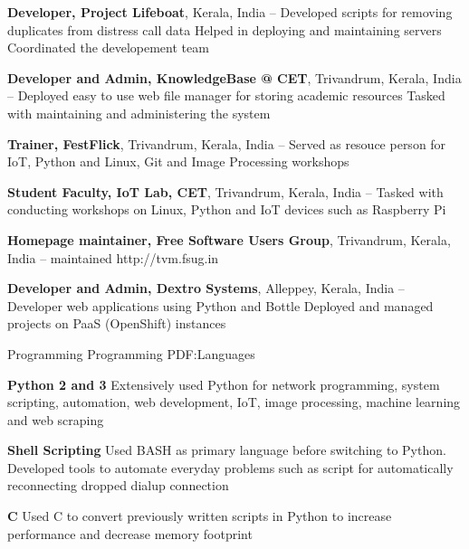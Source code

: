 \documentclass[letterpaper,MMMyyyy,nonstopmode]{simpleresumecv}
\begin{document}
\begin{Body}
\BigGap
\Entry
{\textbf{Developer, Project Lifeboat}},
Kerala, India
\hfill
{} -- 
\Gap
\BulletItem
Developed scripts for removing duplicates from distress call data
\BulletItem
Helped in deploying and maintaining servers
\BulletItem
Coordinated the developement team

\BigGap
\Entry
{\textbf{Developer and Admin, KnowledgeBase @ CET}},
Trivandrum, Kerala, India
\hfill
{} -- 
\Gap
\BulletItem
Deployed easy to use web file manager for storing academic resources 
\BulletItem
Tasked with maintaining and administering the system

\BigGap
\Entry
{\textbf{Trainer, FestFlick}},
Trivandrum, Kerala, India
\hfill
{} -- 
\Gap
\BulletItem
Served as resouce person for IoT, Python and Linux, Git and Image Processing
workshops

\BigGap
\Entry
{\textbf{Student Faculty, IoT Lab, CET}},
Trivandrum, Kerala, India
\hfill
{} -- 
\Gap
\BulletItem
Tasked with conducting workshops on Linux, Python and IoT devices such as
Raspberry Pi

\BigGap
\Entry
{\textbf{Homepage maintainer, Free Software Users Group}},
Trivandrum, Kerala, India
\hfill
{} -- 
\Gap
\BulletItem
maintained http://tvm.fsug.in

\BigGap
\Entry
{\textbf{Developer and Admin, Dextro Systems}},
Alleppey, Kerala, India
\hfill
{} -- 
\Gap
\BulletItem
Developer web applications using Python and Bottle
\BulletItem
Deployed and managed projects on PaaS (OpenShift) instances 

\BigGap
\Section
{Programming}
{Programming}
{PDF:Languages}

\BulletItem
\textbf{Python 2 and 3}
\SubBulletItem
Extensively used Python for network programming, system scripting, automation,
web development, IoT, image processing, machine learning and web scraping

\BigGap
\BulletItem
\textbf{Shell Scripting}
\SubBulletItem
Used BASH as primary language before switching to Python. Developed tools to
automate everyday problems such as script for automatically reconnecting dropped
dialup connection

\BigGap
\BulletItem
\textbf{C}
\SubBulletItem
Used C to convert previously written scripts in Python to increase performance
and decrease memory footprint


\end{Body}
\end{document}
